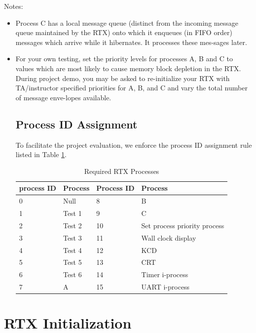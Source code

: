 Notes:
\begin{itemize}
\item Process C has a local message queue (distinct from the incoming message queue maintained by the RTX) onto which it enqueues (in FIFO order) messages which arrive while it hibernates. It processes these mes-sages later.
\item For your own testing, set the priority levels for processes A, B and C to values which are most likely to cause memory block depletion in the RTX. During project demo, you may be asked to re-initialize your RTX with TA/instructor specified priorities for A, B, and C and vary the total number of message enve-lopes available.

\section{Process ID Assignment}
To facilitate the project evaluation, we enforce the process ID assignment rule listed in Table \ref{tb_rtx_procs}. 
\begin{table}[h]
\begin{center}
\begin{tabular}{|l|l||l|l|}
\hline
process ID & Process & Process ID & Process \\ \hline \hline
0  & Null    & 8  &   B \\ \hline
1  & Test  1 & 9  &   C \\ \hline
2  & Test  2 & 10 & Set process priority process \\ \hline
3  & Test  3 & 11 & Wall clock display \\ \hline
4  & Test  4 & 12 & KCD \\ \hline
5  & Test  5 & 13 & CRT \\ \hline
6  & Test  6 & 14 & Timer i-process \\ \hline
7  & A       & 15 & UART i-process \\ \hline
\end{tabular}
\caption{Required RTX Processes}
\label{tb_rtx_procs}
\end{center}
\end{table}


\end{itemize}
\chapter{RTX Initialization}
\label{p01_ch_rtx_init}

